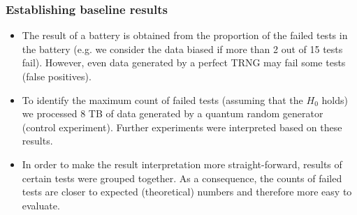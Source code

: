 \documentclass[aspectratio=169]{beamer}
\begin{document}
\begin{frame}
\frametitle{Establishing baseline results}
\begin{itemize}
\item The result of a battery is obtained from the proportion of the failed tests in the battery (e.g. we consider the data biased if more than 2 out of 15 tests fail). However, even data generated by a perfect TRNG may fail some tests (false positives).
\item To identify the maximum count of failed tests (assuming that the $H_0$ holds) we processed 8 TB of data generated by a quantum random generator (control experiment). Further experiments were interpreted based on these results.
\item In order to make the result interpretation more straight-forward, results of certain tests were grouped together. As a consequence, the counts of failed tests are closer to expected (theoretical) numbers and therefore more easy to evaluate.
\end{itemize}
\end{frame}
\end{document}
